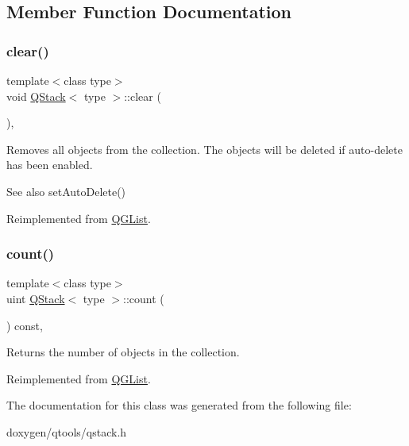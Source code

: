\subsection{Member Function Documentation}
\mbox{\label{class_q_stack_a07ac0d10d6912270790d0c1a82ee2715}} 
\subsubsection{\texorpdfstring{clear()}{clear()}}
{\footnotesize\ttfamily template$<$class type$>$ \\
void \mbox{\hyperlink{class_q_stack}{Q\+Stack}}$<$ type $>$\+::clear (\begin{DoxyParamCaption}{ }\end{DoxyParamCaption})\hspace{0.3cm}{\ttfamily [inline]}, {\ttfamily [virtual]}}

Removes all objects from the collection. The objects will be deleted if auto-\/delete has been enabled. \begin{DoxySeeAlso}{See also}
set\+Auto\+Delete() 
\end{DoxySeeAlso}


Reimplemented from \mbox{\hyperlink{class_q_g_list_a9b89540497bfcf674466dcf9e343d981}{Q\+G\+List}}.

\mbox{\label{class_q_stack_a39f4fccb4ce975b29f5ed06b78316c24}} 
\subsubsection{\texorpdfstring{count()}{count()}}
{\footnotesize\ttfamily template$<$class type$>$ \\
uint \mbox{\hyperlink{class_q_stack}{Q\+Stack}}$<$ type $>$\+::count (\begin{DoxyParamCaption}{ }\end{DoxyParamCaption}) const\hspace{0.3cm}{\ttfamily [inline]}, {\ttfamily [virtual]}}

Returns the number of objects in the collection. 

Reimplemented from \mbox{\hyperlink{class_q_g_list_af765260057e85e575adff7fd9f25d062}{Q\+G\+List}}.



The documentation for this class was generated from the following file\+:\begin{DoxyCompactItemize}
\item 
doxygen/qtools/qstack.\+h\end{DoxyCompactItemize}
